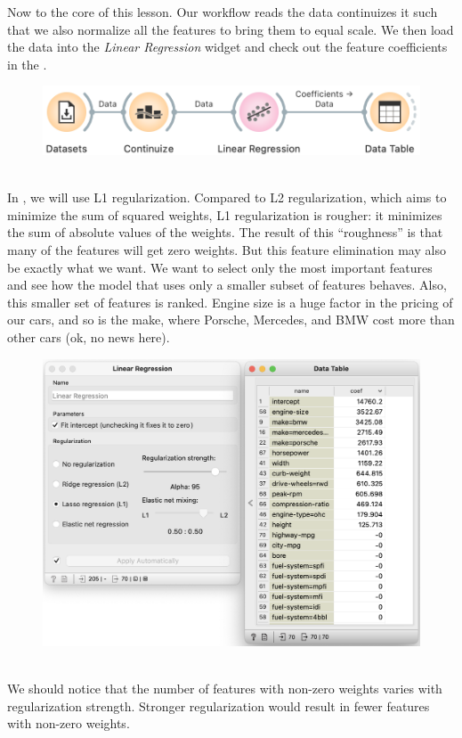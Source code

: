 Now to the core of this lesson. Our workflow reads the data continuizes it such that we also normalize all the features to bring them to equal scale. We then load the data into the {\em Linear Regression} widget and check out the feature coefficients in the .

\begin{figure}[h]
    \centering
    \includegraphics[scale=0.5]{workflow-cont-lr.png}
    \caption{$\;$}
\end{figure}

In , we will use L1 regularization. Compared to L2 regularization, which aims to minimize the sum of squared weights, L1 regularization is rougher: it minimizes the sum of absolute values of the weights. The result of this ``roughness'' is that many of the features will get zero weights. But this feature elimination may also be exactly what we want. We want to select only the most important features and see how the model that uses only a smaller subset of features behaves. Also, this smaller set of features is ranked. Engine size is a huge factor in the pricing of our cars, and so is the make, where Porsche, Mercedes, and BMW cost more than other cars (ok, no news here).

\begin{figure}[h]
    \centering
    \includegraphics[scale=0.4]{coefficients.png}
    \caption{$\;$}
\end{figure}

We should notice that the number of features with non-zero weights varies with regularization strength. Stronger regularization would result in fewer features with non-zero weights.

